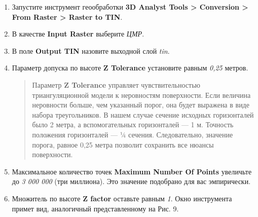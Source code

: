 \documentclass[12pt,]{book}
\begin{document}
\begin{enumerate}
\def\labelenumi{\arabic{enumi}.}
\item
  Запустите инструмент геообработки \textbf{3D Analyst Tools \textgreater{} Conversion \textgreater{} From Raster \textgreater{} Raster to TIN}.
\item
  В качестве \textbf{Input Raster} выберите \emph{ЦМР}.
\item
  В поле \textbf{Output TIN} назовите выходной слой \emph{tin}.
\item
  Параметр допуска по высоте \textbf{Z Tolerance} установите равным \emph{0,25} метров.

  \begin{quote}
  Параметр \textbf{Z Tolerance} управляет чувствительностью триангуляционной модели к неровностям поверхности. Если величина неровности больше, чем указанный порог, она будет выражена в виде набора треугольников. В нашем случае сечение исходных горизонталей было 2 метра, а вспомогательных горизонталей --- 1 м. Точность положения горизонталей --- ¼ сечения. Следовательно, значение порога, равное 0,25 метра позволит сохранить все нюансы поверхности.
  \end{quote}
\item
  Максимальное количество точек \textbf{Maximum Number Of Points} увеличьте до \emph{3 000 000} (три миллиона). Это значение подобрано для вас эмпирически.
\item
  Множитель по высоте \textbf{Z factor} оставьте равным \emph{1}. Окно инструмента примет вид, аналогичный представленному на Рис. 9.


\end{enumerate}
\end{document}
